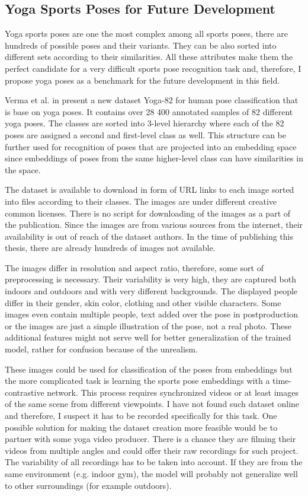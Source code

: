 \subsection{Yoga Sports Poses for Future Development}

Yoga sports poses are one the most complex among all sports poses, there are hundreds of possible poses and their variants. They can be also sorted into different sets according to their similarities. All these attributes make them the perfect candidate for a very difficult sports pose recognition task and, therefore, I propose yoga poses as a benchmark for the future development in this field.

Verma et al. in \cite{verma2020yoga} present a new dataset Yoga-82 for human pose classification that is base on yoga poses. It contains over 28 400 annotated samples of 82 different yoga poses. The classes are sorted into 3-level hierarchy where each of the 82 poses are assigned a second and first-level class as well. This structure can be further used for recognition of poses that are projected into an embedding space since embeddings of poses from the same higher-level class can have similarities in the space.

The dataset is available to download in form of URL links to each image sorted into files according to their classes. The images are under different creative common licenses. There is no script for downloading of the images as a part of the publication. Since the images are from various sources from the internet, their availability is out of reach of the dataset authors. In the time of publishing this thesis, there are already hundreds of images not available.

The images differ in resolution and aspect ratio, therefore, some sort of preprocessing is necessary. Their variability is very high, they are captured both indoors and outdoors and with very different backgrounds. The displayed people differ in their gender, skin color, clothing and other visible characters. Some images even contain multiple people, text added over the pose in postproduction or the images are just a simple illustration of the pose, not a real photo. These additional features might not serve well for better generalization of the trained model, rather for confusion because of the unrealism.

These images could be used for classification of the poses from embeddings but the more complicated task is learning the sports pose embeddings with a time-contrastive network. This process requires synchronized videos or at least images of the same scene from different viewpoints. I have not found such dataset online and therefore, I suspect it has to be recorded specifically for this task. One possible solution for making the dataset creation more feasible would be to partner with some yoga video producer. There is a chance they are filming their videos from multiple angles and could offer their raw recordings for such project. The variability of all recordings has to be taken into account. If they are from the same environment (e.g. indoor gym), the model will probably not generalize well to other surroundings (for example outdoors).
